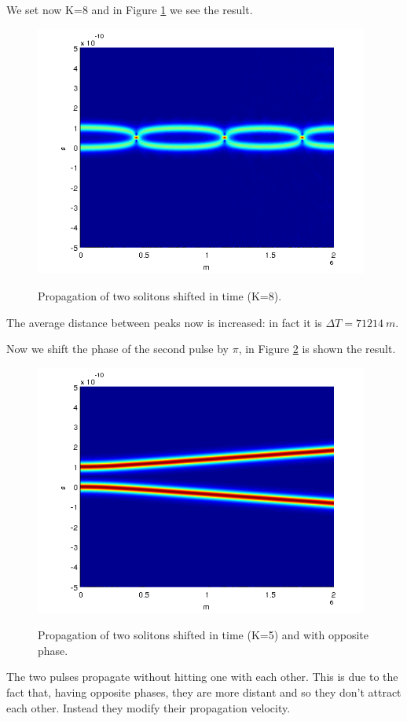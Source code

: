 \documentclass[a4paper,10pt]{report}
\begin{document}
We set now K=8 and in Figure \ref{es6_2} we see the result.
\begin{figure}[!ht]
  \centering
  \includegraphics[width=11cm]{es6_2.png}\\
  \caption{Propagation of two solitons shifted in time (K=8).}
  \label{es6_2}
\end{figure}
The average distance between peaks now is increased: in fact it is $\Delta T=71214 \ m$.

Now we shift the phase of the second pulse by $\pi$, in Figure \ref{es6_3} is shown the result.
\begin{figure}[!ht]
  \centering
  \includegraphics[width=11cm]{es6_3.png}\\
  \caption{Propagation of two solitons shifted in time (K=5) and with opposite phase.}
  \label{es6_3}
\end{figure}

The two pulses propagate without hitting one with each other. This is due to the fact that, having opposite phases,
they are more distant and so they don't attract each other. Instead they modify their propagation velocity.
\end{document}
